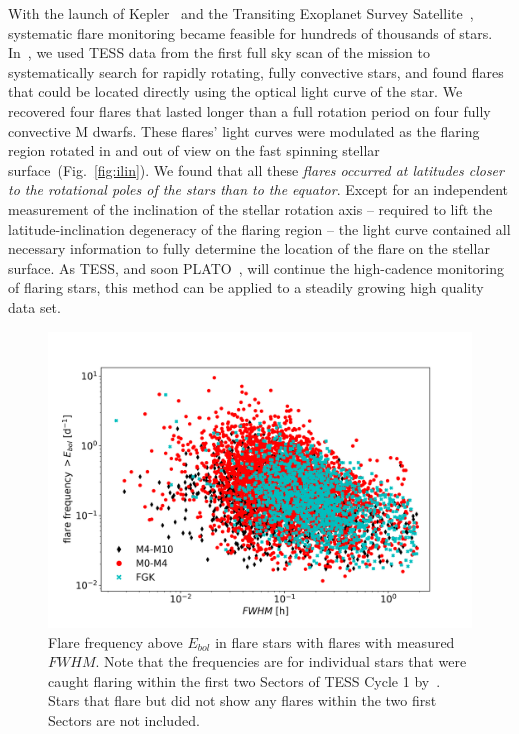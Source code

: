\documentclass[proof]{WileyASNA-v1}
\begin{document}
With the launch of Kepler~\citep{borucki2010} and the Transiting Exoplanet Survey Satellite~\citep[TESS,][]{ricker2015}, systematic flare monitoring became feasible for hundreds of thousands of stars. In~\citet{ilin2021b}, we used TESS data from the first full sky scan of the mission to systematically search for rapidly rotating, fully convective stars, and found flares that could be located directly using the optical light curve of the star. 
We recovered four flares that lasted longer than a full rotation period on four fully convective M dwarfs.
These flares' light curves were modulated as the flaring region rotated in and out of view on the fast spinning stellar surface~(Fig.~\ref{fig:ilin}). We found that all these \textit{flares occurred at latitudes closer to the rotational poles of the stars than to the equator}.
Except for an independent measurement of the inclination of the stellar rotation axis -- required to lift the latitude-inclination degeneracy of the flaring region -- the light curve contained all necessary information to fully determine the location of the flare on the stellar surface.
As TESS, and soon PLATO~\citep{rauer2014}, will continue the high-cadence monitoring of flaring stars, this method can be applied to a steadily growing high quality data set.



\begin{figure}
    \centering
    \includegraphics[width=\hsize]{guenther_repr_fwhm_freq.png}
    \caption{Flare frequency above $E_{bol}$ in flare stars with flares with measured $FWHM$. Note that the frequencies are for individual stars that were caught flaring within the first two Sectors of TESS Cycle 1 by~\citet{guenther2020}. Stars that flare but did not show any flares within the two first Sectors are not included.}
    \label{fig:guenther}
\end{figure}
\end{document}
